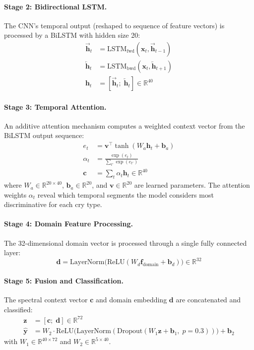 \documentclass[11pt,a4paper]{article}
\begin{document}
\paragraph{Stage 2: Bidirectional LSTM.}
The CNN's temporal output (reshaped to sequence of feature vectors) is
processed by a BiLSTM with hidden size 20:
\begin{align}
  \overrightarrow{\mathbf{h}}_t &= \text{LSTM}_{\text{fwd}}
    (\mathbf{x}_t, \overrightarrow{\mathbf{h}}_{t-1}) \\
  \overleftarrow{\mathbf{h}}_t &= \text{LSTM}_{\text{bwd}}
    (\mathbf{x}_t, \overleftarrow{\mathbf{h}}_{t+1}) \\
  \mathbf{h}_t &= [\overrightarrow{\mathbf{h}}_t;\;
    \overleftarrow{\mathbf{h}}_t] \in \mathbb{R}^{40}
\end{align}

\paragraph{Stage 3: Temporal Attention.}
An additive attention mechanism computes a weighted context vector from
the BiLSTM output sequence:
\begin{align}
  e_t &= \mathbf{v}^{\top} \tanh(W_a \mathbf{h}_t + \mathbf{b}_a)
  \label{eq:attn_score} \\
  \alpha_t &= \frac{\exp(e_t)}{\sum_{t'} \exp(e_{t'})}
  \label{eq:attn_weight} \\
  \mathbf{c} &= \sum_t \alpha_t \mathbf{h}_t \in \mathbb{R}^{40}
  \label{eq:context}
\end{align}
where $W_a \in \mathbb{R}^{20 \times 40}$, $\mathbf{b}_a \in
\mathbb{R}^{20}$, and $\mathbf{v} \in \mathbb{R}^{20}$ are learned
parameters. The attention weights $\alpha_t$ reveal which temporal
segments the model considers most discriminative for each cry type.

\paragraph{Stage 4: Domain Feature Processing.}
The 32-dimensional domain vector is processed through a single fully
connected layer:
\begin{equation}
  \mathbf{d} = \text{LayerNorm}\bigl(\text{ReLU}(W_d \mathbf{f}_{\text{domain}}
  + \mathbf{b}_d)\bigr) \in \mathbb{R}^{32}
\end{equation}

\paragraph{Stage 5: Fusion and Classification.}
The spectral context vector $\mathbf{c}$ and domain embedding
$\mathbf{d}$ are concatenated and classified:
\begin{align}
  \mathbf{z} &= [\mathbf{c};\; \mathbf{d}] \in \mathbb{R}^{72} \\
  \hat{\mathbf{y}} &= W_2 \cdot \text{ReLU}\bigl(
    \text{LayerNorm}(\text{Dropout}(W_1 \mathbf{z} + \mathbf{b}_1,\; p=0.3))
  \bigr) + \mathbf{b}_2
\end{align}
with $W_1 \in \mathbb{R}^{40 \times 72}$ and
$W_2 \in \mathbb{R}^{5 \times 40}$.
\end{document}
